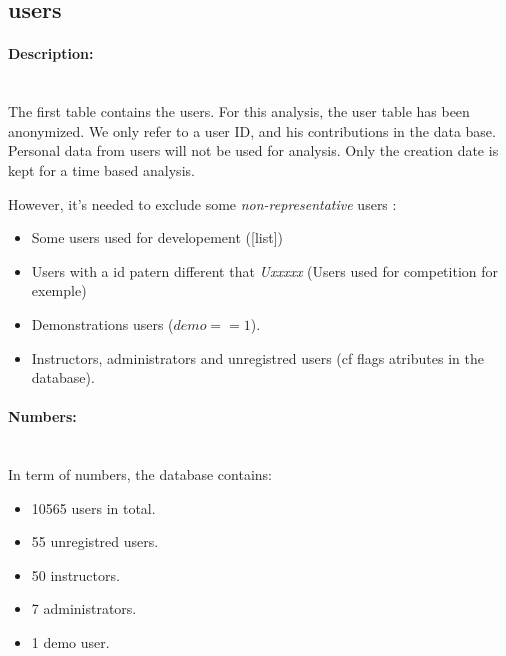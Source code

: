 \documentclass[../main.tex]{subfiles}
\begin{document}
\subsection{users} %
\label{sub:users}

\fboxsep=0mm%
\fboxrule=2pt%

\begin{figure}
  \vspace{-20pt}
  \begin{center}
  \end{center}
  \vspace{-20pt}
\end{figure}

\paragraph{Description:}~\\ %
The first table contains the users. For this analysis, the user table has been anonymized. We only refer to a user ID, and his contributions in the data base. Personal data from users will not be used for analysis. Only the creation date is kept for a time based analysis.  

However, it's needed to exclude some \emph{non-representative} users :

\begin{itemize}
	\setlength\itemsep{0em}
	\item Some users used for developement ([list])
	\item Users with a id patern different that \emph{Uxxxxx} (Users used for competition for exemple)
	\item Demonstrations users ($demo == 1 $).
	\item Instructors, administrators and unregistred users (cf flags atributes in the database).
\end{itemize}

\paragraph{Numbers:}~\\ %
In term of numbers, the database contains:
\begin{itemize}
	\setlength\itemsep{0em}
	\item 10565 users in total.
	\item 55 unregistred users.
	\item 50 instructors.
	\item 7 administrators.
	\item 1 demo user.
\end{itemize}
\end{document}
